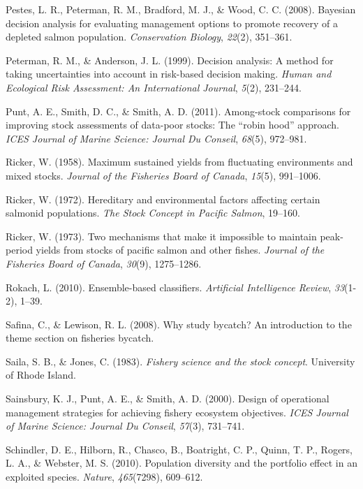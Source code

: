 \documentclass[12pt,]{scrartcl}
\begin{document}
\hypertarget{ref-pestes2008bayesian}{}
Pestes, L. R., Peterman, R. M., Bradford, M. J., \& Wood, C. C. (2008).
Bayesian decision analysis for evaluating management options to promote
recovery of a depleted salmon population. \emph{Conservation Biology},
\emph{22}(2), 351--361.

\hypertarget{ref-peterman1999decision}{}
Peterman, R. M., \& Anderson, J. L. (1999). Decision analysis: A method
for taking uncertainties into account in risk-based decision making.
\emph{Human and Ecological Risk Assessment: An International Journal},
\emph{5}(2), 231--244.

\hypertarget{ref-punt2011among}{}
Punt, A. E., Smith, D. C., \& Smith, A. D. (2011). Among-stock
comparisons for improving stock assessments of data-poor stocks: The
``robin hood'' approach. \emph{ICES Journal of Marine Science: Journal
Du Conseil}, \emph{68}(5), 972--981.

\hypertarget{ref-ricker1958maximum}{}
Ricker, W. (1958). Maximum sustained yields from fluctuating
environments and mixed stocks. \emph{Journal of the Fisheries Board of
Canada}, \emph{15}(5), 991--1006.

\hypertarget{ref-ricker1972hereditary}{}
Ricker, W. (1972). Hereditary and environmental factors affecting
certain salmonid populations. \emph{The Stock Concept in Pacific
Salmon}, 19--160.

\hypertarget{ref-ricker1973two}{}
Ricker, W. (1973). Two mechanisms that make it impossible to maintain
peak-period yields from stocks of pacific salmon and other fishes.
\emph{Journal of the Fisheries Board of Canada}, \emph{30}(9),
1275--1286.

\hypertarget{ref-rokach2010ensemble}{}
Rokach, L. (2010). Ensemble-based classifiers. \emph{Artificial
Intelligence Review}, \emph{33}(1-2), 1--39.

\hypertarget{ref-safina2008study}{}
Safina, C., \& Lewison, R. L. (2008). Why study bycatch? An introduction
to the theme section on fisheries bycatch.

\hypertarget{ref-saila1983fishery}{}
Saila, S. B., \& Jones, C. (1983). \emph{Fishery science and the stock
concept}. University of Rhode Island.

\hypertarget{ref-sainsbury2000design}{}
Sainsbury, K. J., Punt, A. E., \& Smith, A. D. (2000). Design of
operational management strategies for achieving fishery ecosystem
objectives. \emph{ICES Journal of Marine Science: Journal Du Conseil},
\emph{57}(3), 731--741.

\hypertarget{ref-schindler2010population}{}
Schindler, D. E., Hilborn, R., Chasco, B., Boatright, C. P., Quinn, T.
P., Rogers, L. A., \& Webster, M. S. (2010). Population diversity and
the portfolio effect in an exploited species. \emph{Nature},
\emph{465}(7298), 609--612.
\end{document}
